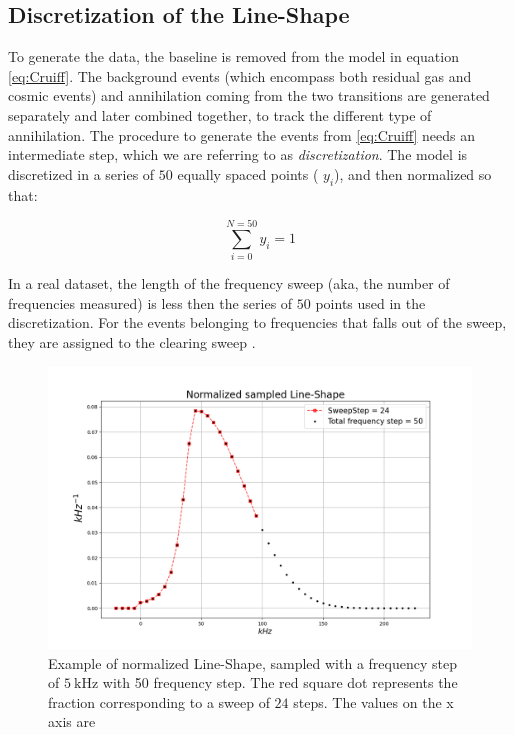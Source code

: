 \documentclass[11pt,a4paper,oneside]{article}
\begin{document}
\subsection{Discretization of the Line-Shape}

To generate the data, the baseline is removed from the model in equation \ref{eq:Cruiff}. The background events (which encompass both residual gas and cosmic events) and annihilation coming from the two transitions are generated separately and later combined together, to track the different type of annihilation. The procedure to generate the events from \ref{eq:Cruiff} needs an intermediate step, which we are referring to as \textit{discretization}. The model is discretized in a series of $50$ equally spaced points ( $y_{i}$), and then normalized so that: 

\begin{equation}
\sum_{i = 0}^{N = 50} y_{i} = 1
\end{equation}

In a real dataset, the length of the frequency sweep (aka, the number of frequencies measured) is less then the series of $50$ points used in the discretization. For the events belonging to frequencies that falls out of the sweep, they are assigned to the clearing sweep {\color{red}{(not done yet)}}.

\begin{figure}[hbtp]
\centering
\includegraphics[width=1\textwidth]{NormalizedLineshape.pdf}
\caption{Example of normalized Line-Shape, sampled with a frequency step of $\SI{5}{\kilo \hertz}$ with 50 frequency step. The red square dot represents the fraction corresponding to a sweep of $24$ steps. The values on the x axis are }
\end{figure}
\end{document}
